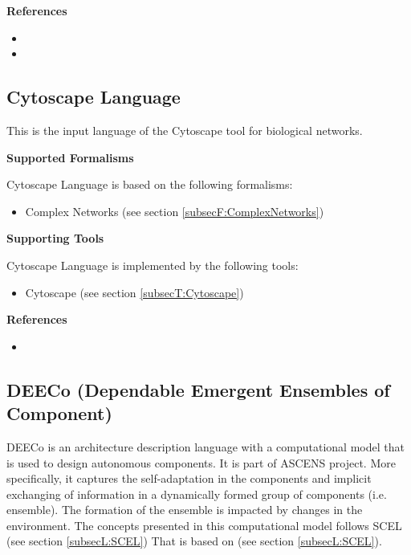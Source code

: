 \textbf{References}
\begin{itemize}
	
\item {}
	
\item {}
\end{itemize}



\subsection{Cytoscape Language}
\label{subsecL:CytoscapeLanguage}


This is the input language of the Cytoscape tool for biological networks.

\textbf{Supported Formalisms}

Cytoscape Language is based on the following formalisms:
\begin{itemize}
	\item Complex Networks (see section \ref{subsecF:ComplexNetworks})
\end{itemize}


\textbf{Supporting Tools}

Cytoscape Language is implemented by the following tools:
\begin{itemize}
	\item Cytoscape (see section \ref{subsecT:Cytoscape})
\end{itemize}


\textbf{References}
\begin{itemize}
	
\item {}
\end{itemize}



\subsection{DEECo (Dependable Emergent Ensembles of Component)}
\label{subsecL:DEECo}


DEECo is an architecture description language with a computational model that is used to design autonomous components. It is part of ASCENS project. More specifically, it captures the self-adaptation in the components and implicit exchanging of information in a dynamically formed group of components (i.e. ensemble). The formation of the ensemble is impacted by changes in the environment. The concepts presented in this computational model follows SCEL (see section \ref{subsecL:SCEL}) That is based on (see section \ref{subsecL:SCEL}).

